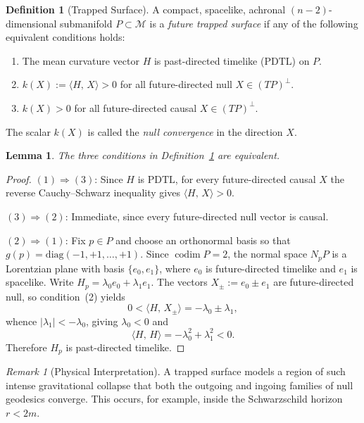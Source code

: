 \documentclass[12pt, a4paper]{article}
\theoremstyle{plain}
\newtheorem{lemma}[theorem]{Lemma}
\theoremstyle{definition}
\newtheorem{definition}[theorem]{Definition}
\theoremstyle{remark}
\newtheorem{remark}[theorem]{Remark}
\newcommand{\M}{\mathcal{M}}
\newcommand{\PDTL}{\mathrm{PDTL}}
\newcommand{\ls}[2]{\langle #1,\, #2 \rangle}
\begin{document}
\begin{definition}[Trapped Surface]
\label{def:trapped-surface}
  A compact, spacelike, achronal $(n-2)$-dimensional submanifold $P \subset \M$ is a
  \emph{future trapped surface} if any of the following equivalent conditions holds:
  \begin{enumerate}
    \item The mean curvature vector $H$ is past-directed timelike ($\PDTL$) on $P$.
    \item $k(X) := \ls{H}{X} > 0$ for all future-directed null $X \in (TP)^\perp$.
    \item $k(X) > 0$ for all future-directed causal $X \in (TP)^\perp$.
  \end{enumerate}
  The scalar $k(X)$ is called the \emph{null convergence} in the direction $X$.
\end{definition}

\begin{lemma}
\label{lem:trapped-surface}
  The three conditions in Definition~\ref{def:trapped-surface} are
  equivalent.
\end{lemma}

\begin{proof}
  $(1) \Rightarrow (3)$: Since $H$ is $\PDTL$, for every future-directed
  causal $X$ the reverse Cauchy--Schwarz inequality gives
  $\ls{H}{X} > 0$.

  $(3) \Rightarrow (2)$: Immediate, since every future-directed null vector is causal.

  $(2) \Rightarrow (1)$: Fix $p \in P$ and choose an orthonormal basis so that
  $g(p) = \mathrm{diag}(-1,+1,\ldots,+1)$. Since $\operatorname{codim} P = 2$,
  the normal space $N_pP$ is a Lorentzian plane with basis $\{e_0, e_1\}$,
  where $e_0$ is future-directed timelike and $e_1$ is spacelike.
  Write $H_p = \lambda_0 e_0 + \lambda_1 e_1$. The vectors
  $X_\pm := e_0 \pm e_1$ are future-directed null, so condition~(2) yields
  \[
    0 < \ls{H}{X_\pm} = -\lambda_0 \pm \lambda_1,
  \]
  whence $|\lambda_1| < -\lambda_0$, giving $\lambda_0 < 0$ and
  \[
    \ls{H}{H} = -\lambda_0^2 + \lambda_1^2 < 0.
  \]
  Therefore $H_p$ is past-directed timelike.
\end{proof}

\begin{remark}[Physical Interpretation]
  A trapped surface models a region of such intense gravitational
  collapse that both the outgoing and ingoing families of null
  geodesics converge. This occurs, for example, inside the
  Schwarzschild horizon $r < 2m$.
\end{remark}
\end{document}
